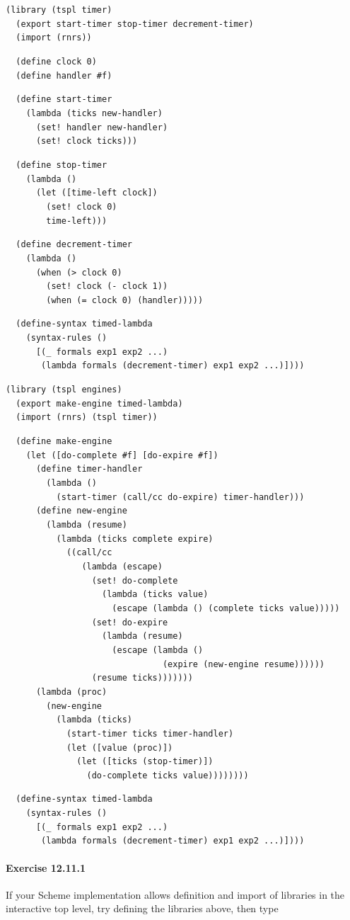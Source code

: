 \begin{alltt}
(library (tspl timer)
  (export start-timer stop-timer decrement-timer)
  (import (rnrs))

  (define clock 0)
  (define handler \#{}f)

  (define start-timer
    (lambda (ticks new-handler)
      (set! handler new-handler)
      (set! clock ticks)))

  (define stop-timer
    (lambda ()
      (let ([time-left clock])
        (set! clock 0)
        time-left)))

  (define decrement-timer
    (lambda ()
      (when (\textgreater{} clock 0)
        (set! clock (- clock 1))
        (when (= clock 0) (handler)))))

  (define-syntax timed-lambda
    (syntax-rules ()
      [(\_{} formals exp1 exp2 ...)
       (lambda formals (decrement-timer) exp1 exp2 ...)])))

(library (tspl engines)
  (export make-engine timed-lambda)
  (import (rnrs) (tspl timer))

  (define make-engine
    (let ([do-complete \#{}f] [do-expire \#{}f])
      (define timer-handler
        (lambda ()
          (start-timer (call/cc do-expire) timer-handler)))
      (define new-engine
        (lambda (resume)
          (lambda (ticks complete expire)
            ((call/cc
               (lambda (escape)
                 (set! do-complete
                   (lambda (ticks value)
                     (escape (lambda () (complete ticks value)))))
                 (set! do-expire
                   (lambda (resume)
                     (escape (lambda ()
                               (expire (new-engine resume))))))
                 (resume ticks)))))))
      (lambda (proc)
        (new-engine
          (lambda (ticks)
            (start-timer ticks timer-handler)
            (let ([value (proc)])
              (let ([ticks (stop-timer)])
                (do-complete ticks value))))))))

  (define-syntax timed-lambda
    (syntax-rules ()
      [(\_{} formals exp1 exp2 ...)
       (lambda formals (decrement-timer) exp1 exp2 ...)])))
\end{alltt}

\paragraph{Exercise \label{examples_g212}12.11.1}


\label{examples_s101}If your Scheme implementation allows definition and import of libraries
in the interactive top level, try defining the libraries above, then
type


